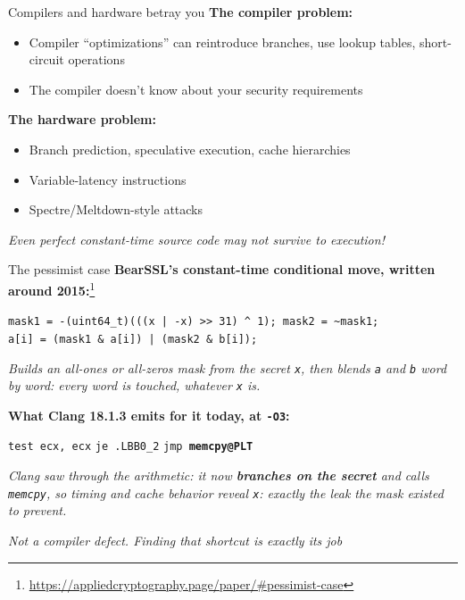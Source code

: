 \ifdefined\PRESENTATION\else\PassOptionsToClass{handout}{beamer}\fi\documentclass[aspectratio=169, lualatex]{beamer}
\begin{document}
\begin{frame}{Compilers and hardware betray you}
	\textbf{The compiler problem:}
	\begin{itemize}
		\item Compiler ``optimizations'' can reintroduce branches, use lookup tables, short-circuit operations
		\item The compiler doesn't know about your security requirements
	\end{itemize}
	\vspace{0.5em}
	\textbf{The hardware problem:}
	\begin{itemize}
		\item Branch prediction, speculative execution, cache hierarchies
		\item Variable-latency instructions
		\item Spectre/Meltdown-style attacks
	\end{itemize}
	\vspace{0.5em}
	\begin{center}
		\textit{Even perfect constant-time source code may not survive to execution!}
	\end{center}
\end{frame}

\begin{frame}{The pessimist case}
	\textbf{BearSSL's constant-time conditional move, written around 2015:}\footnote{\url{https://appliedcryptography.page/paper/\#pessimist-case}}
	\begin{flushleft}
		\texttt{mask1 = -(uint64\_t)(((x | -x) >> 31) \textasciicircum{} 1); mask2 = \textasciitilde mask1;}\\
		\texttt{a[i] = (mask1 \& a[i]) | (mask2 \& b[i]);}
	\end{flushleft}
	{\scriptsize\textit{Builds an all-ones or all-zeros mask from the secret \texttt{x}, then blends \texttt{a} and \texttt{b} word by word: every word is touched, whatever \texttt{x} is.}}
	\vspace{0.4em}

	\textbf{What Clang 18.1.3 emits for it today, at \texttt{-O3}:}
	\begin{flushleft}
		\texttt{test ecx, ecx} \quad \texttt{je .LBB0\_2} \quad \texttt{jmp \textbf{memcpy@PLT}}
	\end{flushleft}
	{\scriptsize\textit{Clang saw through the arithmetic: it now \textbf{branches on the secret} and calls \texttt{memcpy}, so timing and cache behavior reveal \texttt{x}: exactly the leak the mask existed to prevent.}}
	\vspace{0.4em}
	\begin{center}
		\textit{Not a compiler defect. Finding that shortcut is exactly its job}
	\end{center}
\end{frame}
\end{document}

